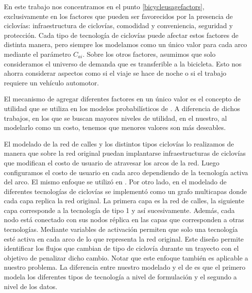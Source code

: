 En este trabajo nos concentramos en el punto \ref{bicycleusagefactors}, exclusivamente en los factores que pueden ser favorecidos por la presencia de ciclovías: infraestructura de ciclovías, comodidad y conveniencia, seguridad y protección. Cada tipo de tecnología de ciclovías puede afectar estos factores de distinta manera, pero siempre los modelamos como un único valor para cada arco mediante el parámetro $C_{ai}$. Sobre los otros factores, asumimos que solo consideramos el universo de demanda que es transferible a la bicicleta. Esto nos ahorra considerar aspectos como si el viaje se hace de noche o si el trabajo requiere un vehículo automotor.

El mecanismo de agregar diferentes factores en un único valor es el concepto de utilidad que se utiliza en los modelos probabilísticos de \textcite{ortuz2011, Pacheco2021}. A diferencia de dichos trabajos, en los que se buscan mayores niveles de utilidad, en el nuestro, al modelarlo como un costo, tenemos que menores valores son más deseables.

El modelado de la red de calles y los distintos tipos ciclovías lo realizamos de manera que sobre la red original puedan implantarse infraestructuras de ciclovías que modifican el costo de usuario de atravesar los arcos de la red. Luego configuramos el costo de usuario en cada arco dependiendo de la tecnología activa del arco. El mismo enfoque se utilizó en \parencite{Lin2013, Zhu2019}. Por otro lado, en \parencite{baya2021} el modelado de diferentes tecnologías de ciclovías se implementó como un grafo multicapas donde cada capa replica la red original. La primera capa es la red de calles, la siguiente capa corresponde a la tecnología de tipo 1 y así sucesivamente. Además, cada nodo está conectado con sus nodos réplica en las capas que corresponden a otras tecnologías. Mediante variables de activación permiten que solo una tecnología esté activa en cada arco de lo que representa la red original. Este diseño permite identificar los flujos que cambian de tipo de ciclovía durante un trayecto con el objetivo de penalizar dicho cambio. Notar que este enfoque también es aplicable a nuestro problema. La diferencia entre nuestro modelado y el de \textcite{baya2021} es que el primero modela los diferentes tipos de tecnología a nivel de formulación y el segundo a nivel de los datos.
